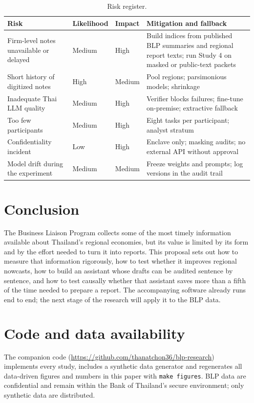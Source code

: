 \documentclass[11pt]{article}
\begin{document}
\begin{table}[tbp]
\centering\small
\caption{Risk register.}\label{tab:risks}
\begin{tabularx}{\textwidth}{@{}L{4.3cm}L{1.6cm}L{1.3cm}Y@{}}
\toprule
Risk & Likelihood & Impact & Mitigation and fallback \\
\midrule
Firm-level notes unavailable or delayed & Medium & High & Build indices from published BLP summaries and regional report texts; run Study 4 on masked or public-text packets \\
Short history of digitized notes & High & Medium & Pool regions; parsimonious models; shrinkage \\
Inadequate Thai LLM quality & Medium & High & Verifier blocks failures; fine-tune on-premise; extractive fallback \\
Too few participants & Medium & High & Eight tasks per participant; analyst stratum \\
Confidentiality incident & Low & High & Enclave only; masking audits; no external API without approval \\
Model drift during the experiment & Medium & Medium & Freeze weights and prompts; log versions in the audit trail \\
\bottomrule
\end{tabularx}
\end{table}

\section{Conclusion}\label{sec:conclusion}
The Business Liaison Program collects some of the most timely information available about Thailand's regional economies, but its value is limited by its form and by the effort needed to turn it into reports. This proposal sets out how to measure that information rigorously, how to test whether it improves regional nowcasts, how to build an assistant whose drafts can be audited sentence by sentence, and how to test causally whether that assistant saves more than a fifth of the time needed to prepare a report. The accompanying software already runs end to end; the next stage of the research will apply it to the BLP data.

\section*{Code and data availability}
The companion code (\url{https://github.com/thanatchon36/blp-research}) implements every study, includes a synthetic data generator and regenerates all data-driven figures and numbers in this paper with \texttt{make figures}. BLP data are confidential and remain within the Bank of Thailand's secure environment; only synthetic data are distributed.
\end{document}
